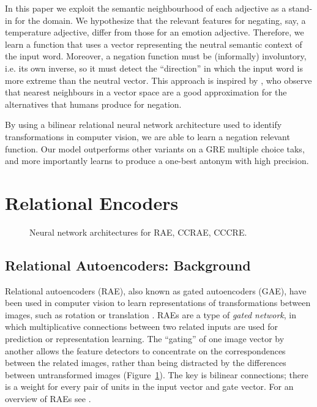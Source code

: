 \documentclass[11pt]{article}
\begin{document}
In this paper we exploit the semantic neighbourhood of each adjective
as a stand-in for the domain. We hypothesize that the relevant
features for negating, say, a temperature adjective, differ from those
for an emotion adjective. Therefore, we learn a function that uses a
vector representing the neutral semantic context of the input
word. Moreover, a negation function must be (informally) involuntory,
i.e. its own inverse, so it must detect the ``direction'' in which the
input word is more extreme than the neutral vector. This approach is inspired by \citet{kruszewski:16},
 who observe that nearest neighbours in a vector space are a good approximation for the 
alternatives that humans produce for negation.

By using a bilinear relational neural network architecture used to
identify transformations in computer vision, we are able to learn a
negation relevant function. Our model outperforms other variants on a
GRE multiple choice taks, and more importantly learns to produce a
one-best antonym with high precision.


\section{Relational Encoders}

\begin{figure}[h!t]
\label{f:arch}
\caption{Neural network architectures for RAE, CCRAE, CCCRE.}
\end{figure}



\subsection{Relational Autoencoders: Background}

Relational autoencoders (RAE), also known as gated autoencoders (GAE),
have been used in computer vision to learn representations of
transformations between images, such as rotation or translation \citep{memisevic:07,memisevic:12,memisevic:13}. RAEs
are a type of {\it gated network}, in which multiplicative connections
between two related inputs are used for prediction or representation
learning. The ``gating'' of one image vector by another allows the feature detectors to concentrate on the correspondences between the related images, rather than being distracted by the differences between untransformed images (Figure~\ref{f:arch}). The key is bilinear connections; there is a weight for every pair of units in the input vector and gate vector. For an overview of RAEs see \citet{memisevic:13,sigaud:15}.
\end{document}
